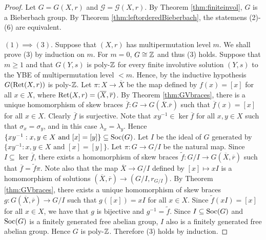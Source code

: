 \begin{proof}
Let $G=G(X,r)$ and $\mathcal{G}=\mathcal{G}(X,r)$. By Theorem \ref{thm:finiteinvol}, $G$ is a Bieberbach group.
By Theorem \ref{thm:leftorderedBieberbach}, the statemens (2)-(6) are equivalent.

$(1)\implies (3).$ Suppose that $(X,r)$ has multipermutation level $m$. We shall prove (3) by induction on $m$. For $m=0$, $G\cong \mathbb{Z}$ and thus (3) holds. Suppose that $m\geq 1$ and that $G(Y,s)$ is poly-$\mathbb{Z}$ for every finite involutive solution $(Y,s)$ to the YBE of multipermutation level $<m$. Hence, by the inductive hypothesis $G(\operatorname{Ret}(X,r))$ is poly-$\mathbb{Z}$. 
Let $\pi \colon X\to\overline{X}$ be the map defined by $f(x)=[x]$ for all $x\in X$, where $\operatorname{Ret}(X,r)=(\overline{X},\overline{r})$.
By Theorem \ref{thm:GVbraces}, there is a unique homomorphism of skew braces $\overline{f}\colon G\to G(\overline{X}.\overline{r})$ such that $\overline{f}(x)=[x]$ for all $x\in X$. Clearly $\overline{f}$ is surjective.
Note that $xy^{-1}\in\ker\overline{f}$ for all $x,y\in X$ such that $\sigma_x=\sigma_y$, and in this case $\lambda_x=\lambda_y$.
Hence $\{ xy^{-1} : x,y\in X \text{ and }[x]=[y]\}\subseteq\operatorname{Soc}(G)$. Let $I$ be the ideal of $G$ generated by $\{xy^{-1} : x,y\in X \text{ and }[x]=[y]\}$. Let $\pi\colon G\to G/I$ be the natural map. Since $I\subseteq \ker\overline{f}$, there exists a homomorphism of skew braces $\tilde{f}\colon G/I\to G(\overline{X},\overline{r})$ such that $\overline{f}=\tilde{f}\pi$. Note also that the map $\overline{X}\to G/I$ defined by $[x]\mapsto xI$ is a homomorphism of solutions $(\overline{X},\overline{r})\to (G/I,r_{G/I})$. By Theorem \ref{thm:GVbraces}, there exists a unique homomorphism of skew braces $g\colon G(\overline{X},\overline{r})\to G/I$ such that $g([x])=xI$ for all $x\in X$. Since $\tilde{f}(xI)=[x]$ for all $x\in X$, we have that $g$ is bijective and $g^{-1}=\tilde{f}$. 
Since $I\subseteq\operatorname{Soc}(G)$ and $\operatorname{Soc}(G)$ is a finitely generated free abelian group, $I$ also is a finitely generated free abelian group. Hence $G$ is poly-$\mathbb{Z}$. Therefore (3) holds by induction.


\end{proof}
